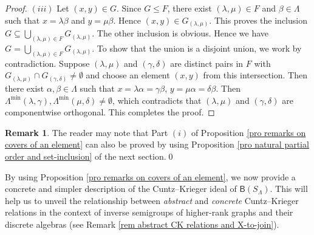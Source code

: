 \documentclass[a4paper,reqno,11pt]{amsart}
\numberwithin{equation}{section}
\theoremstyle{definition}
\newtheorem{rmk}[thm]{Remark}
\theoremstyle{remark}
\begin{document}
\begin{proof}
$(iii)$ Let $(x,y)\in G$. Since $G\le F$, there exist $(\lambda,\mu)\in F$ and $\beta\in \Lambda$ such that $x=\lambda\beta$ and $y=\mu\beta$. Hence $(x,y)\in G_{(\lambda,\mu)}$. This proves the inclusion $G\subseteq \displaystyle{\bigcup_{(\lambda,\mu)\in F}}G_{(\lambda,\mu)}$. The other inclusion is obvious. Hence we have $G=\displaystyle{\bigcup_{(\lambda,\mu)\in F}}G_{(\lambda,\mu)}$. To show that the union is a disjoint union, we work by contradiction. Suppose $(\lambda,\mu)$ and $(\gamma,\delta)$ are distinct pairs in $F$ with $G_{(\lambda,\mu)}\cap G_{(\gamma,\delta)}\neq \emptyset$ and choose an element $(x,y)$ from this intersection. Then there exist $\alpha,\beta\in \Lambda$ such that $x=\lambda\alpha=\gamma\beta$, $y=\mu\alpha=\delta\beta$. Then $\Lambda^{\min}(\lambda,\gamma),\Lambda^{\min}(\mu,\delta)\neq \emptyset$, which contradicts that $(\lambda,\mu)$ and $(\gamma,\delta)$ are componentwise orthogonal. This completes the proof.  
\end{proof}

\begin{rmk}\label{rem an alternate proof of inner cover}
The reader may note that Part $(i)$ of Proposition \ref{pro remarks on covers of an element} can also be proved by using Proposition \ref{pro natural partial order and set-inclusion} of the next section.\qed   
\end{rmk} 

By using Proposition \ref{pro remarks on covers of an element}, we now provide a concrete and simpler description of the Cuntz--Krieger ideal of $\mathsf{B}(S_\Lambda)$. This will help us to unveil the relationship between \emph{abstract} and \emph{concrete} Cuntz--Krieger relations in the context of inverse semigroups of higher-rank graphs and their discrete algebras (see Remark \ref{rem abstract CK relations and X-to-join}). 
\end{document}
